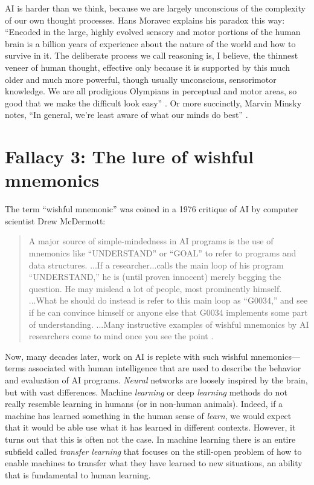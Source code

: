 \documentclass{article}
\begin{document}
AI is harder than we think, because we are largely unconscious of the complexity of our own thought processes. Hans Moravec explains his paradox this way: ``Encoded in the large, highly evolved sensory and motor portions of the human brain is a billion years of experience about the nature of the world and how to survive in it. The deliberate process we call reasoning is, I believe, the thinnest veneer of human thought, effective only because it is supported by this much older and much more powerful, though usually unconscious, sensorimotor knowledge. We are all prodigious Olympians in perceptual and motor areas, so good that we make the difficult look easy'' \cite{Moravec1988b}. Or more succinctly, Marvin Minsky notes, ``In general, we're least aware of what our minds do best'' \cite{Minsky1980}. 

\section*{Fallacy 3: The lure of wishful mnemonics}
The term ``wishful mnemonic'' was coined in a 1976 critique of AI by computer scientist Drew McDermott:

\begin{quote}
     A major source of simple-mindedness in AI programs is the use of mnemonics like ``UNDERSTAND'' or ``GOAL'' to refer to programs and data structures. ...If a researcher...calls the main loop of his program ``UNDERSTAND,'' he is (until proven innocent) merely begging the question. He may mislead a lot of people, most prominently himself. ...What he should do instead is refer to this main loop as ``G0034,'' and see if he can convince himself or anyone else that G0034 implements some part of understanding. ...Many instructive examples of wishful mnemonics by AI researchers come to mind once you see the point \cite{McDermott1976}.
\end{quote}

Now, many decades later, work on AI is replete with such wishful mnemonics---terms associated with human intelligence that are used to describe the behavior and evaluation of AI programs.  \textit{Neural} networks are loosely inspired by the brain, but with vast differences.  Machine \textit{learning} or deep \textit{learning} methods do not really resemble learning in humans (or in non-human animals).  Indeed, if a machine has learned something in the human sense of \textit{learn}, we would expect that it would be able use what it has learned in different contexts.  However, it turns out that this is often not the case.  In machine learning there is an entire subfield called \textit{transfer learning} that focuses on the still-open problem of how to enable machines to transfer what they have learned to new situations, an ability that is fundamental to human learning.
\end{document}

